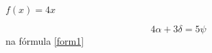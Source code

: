 \documentclass{article}
\begin{document}
$f(x)= 4x$ %

\begin{equation}\label{form1}
4\alpha + 3\delta = 5 \psi
\end{equation}
na fórmula \ref{form1}
\end{document}
